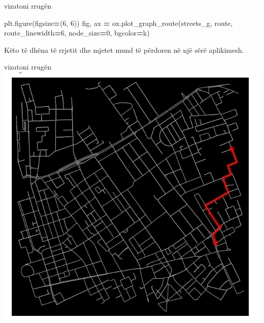\documentclass[
  ignorenonframetext,
]{beamer}
\newenvironment{Shaded}{\begin{snugshade}}{\end{snugshade}}
\newcommand{\DecValTok}[1]{\textcolor[rgb]{0.00,0.00,0.81}{#1}}
\newcommand{\NormalTok}[1]{#1}
\newcommand{\OperatorTok}[1]{\textcolor[rgb]{0.81,0.36,0.00}{\textbf{#1}}}
\newcommand{\StringTok}[1]{\textcolor[rgb]{0.31,0.60,0.02}{#1}}
\begin{document}
\begin{frame}[fragile]{vizatoni rrugën}
\protect\hypertarget{vizatoni-rruguxebn}{}

\begin{Shaded}
\begin{Highlighting}[]
\NormalTok{plt.figure(figsize}\OperatorTok{=}\NormalTok{(}\DecValTok{6}\NormalTok{, }\DecValTok{6}\NormalTok{))}
\NormalTok{fig, ax }\OperatorTok{=}\NormalTok{ ox.plot\_graph\_route(streets\_g, route, route\_linewidth}\OperatorTok{=}\DecValTok{6}\NormalTok{, node\_size}\OperatorTok{=}\DecValTok{0}\NormalTok{, bgcolor}\OperatorTok{=}\StringTok{\textquotesingle{}k\textquotesingle{}}\NormalTok{)}
\end{Highlighting}
\end{Shaded}

Këto të dhëna të rrjetit dhe mjetet mund të përdoren në një sërë
aplikimesh.
\end{frame}

\begin{frame}{vizatoni rrugën}
\protect\hypertarget{vizatoni-rruguxebn-1}{}
\includegraphics{./Figs/rrugshkurter2.png}
\end{frame}
\end{document}
